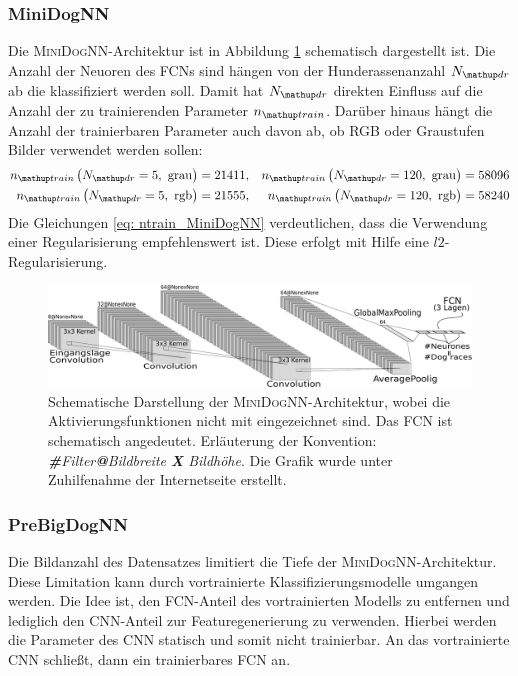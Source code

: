  \subsubsection{MiniDogNN}
Die \textsc{MiniDogNN}-Architektur ist in Abbildung \ref{fig:MiniDogNN} schematisch dargestellt ist.
Die Anzahl der Neuoren des FCNs sind hängen von der
Hunderassenanzahl $N\ua{dr}$ ab die klassifiziert werden soll. Damit hat $N\ua{dr}$
direkten Einfluss auf die Anzahl der zu trainierenden Parameter $n\ua{train}$.
Darüber hinaus hängt die Anzahl der trainierbaren Parameter auch davon ab, ob \textsc{RGB} oder Graustufen Bilder verwendet werden sollen:
 \begin{align}
   \begin{aligned}
     \label{eq: ntrain_MiniDogNN}
   n\ua{train}\left(N\ua{dr}=5, \,\, \mathrm{grau}\right) &= 21411, & n\ua{train}\left(N\ua{dr}=120, \,\, \mathrm{grau}\right) & = 58096 \\
   n\ua{train}\left(N\ua{dr}=5, \,\, \mathrm{rgb}\right) &= 21555, & n\ua{train}\left(N\ua{dr}=120, \,\, \mathrm{rgb}\right) & = 58240
   \end{aligned}
 \end{align}
 Die Gleichungen \eqref{eq: ntrain_MiniDogNN} verdeutlichen,
 dass die Verwendung einer Regularisierung empfehlenswert ist.
 Diese erfolgt mit Hilfe eine $l2$-Regularisierung.
 \begin{figure}
 \centering
 \includegraphics[width=\the\textwidth]{../../final_data/general/MiniDogNN.pdf}
 \caption{Schematische Darstellung der \textsc{MiniDogNN}-Architektur, wobei
          die Aktivierungsfunktionen nicht mit eingezeichnet sind. Das FCN
          ist schematisch angedeutet. Erläuterung der Konvention: \emph{\textbf{\#}Filter\textbf{@}Bildbreite \textbf{X} Bildhöhe}.
          Die Grafik wurde unter Zuhilfenahme der Internetseite \cite{net_svg_source} erstellt.}
 \label{fig:MiniDogNN}
 \end{figure}

\subsubsection{PreBigDogNN}
Die Bildanzahl des Datensatzes limitiert
die Tiefe der \textsc{MiniDogNN}-Architektur. Diese Limitation
kann durch vortrainierte Klassifizierungsmodelle umgangen werden.
Die Idee ist, den FCN-Anteil des vortrainierten Modells zu entfernen
und lediglich den CNN-Anteil zur Featuregenerierung zu verwenden.
Hierbei werden die Parameter des CNN statisch und somit nicht trainierbar.
An das vortrainierte CNN schließt, dann ein trainierbares FCN an.


